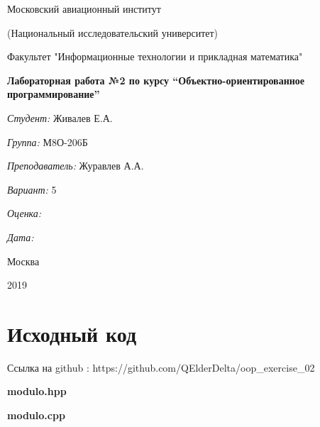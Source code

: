 \documentclass[a4paper, 12pt]{article}
\begin{document}
\thispagestyle{empty}	
\begin{center}
	Московский авиационный институт
	
	(Национальный исследовательский университет)
	
	Факультет "Информационные технологии и прикладная математика"
	
\end{center}
\vspace{40ex}
\begin{center}
	\textbf{\large{Лабораторная работа №2 по курсу \textquotedblleft Объектно-ориентированное программирование\textquotedblright}}
\end{center}
\vspace{40ex}
\begin{flushright}
	\textit{Студент: } Живалев Е.А.
	
	\vspace{2ex}
	\textit{Группа: } М8О-206Б
	
	\vspace{2ex}
	\textit{Преподаватель: } Журавлев А.А.
	
	\vspace{2ex}
	\textit{Вариант: } 5
	
	\vspace{2ex}
	\textit{Оценка: } \underline{\quad\quad\quad\quad\quad\quad}
	
	 \vspace{2ex}
	\textit{Дата: } \underline{\quad\quad\quad\quad\quad\quad}
	
\end{flushright}

\begin{vfill}
	\begin{center}
		Москва
		
		2019
	\end{center}	
\end{vfill}
\newpage
\section{Исходный код}

Ссылка на github : https://github.com/QElderDelta/oop\_exercise\_02

\vspace{3ex}
\textbf{\large{modulo.hpp}}


\vspace{3ex}
\textbf{\large{modulo.cpp}}

\end{document}

